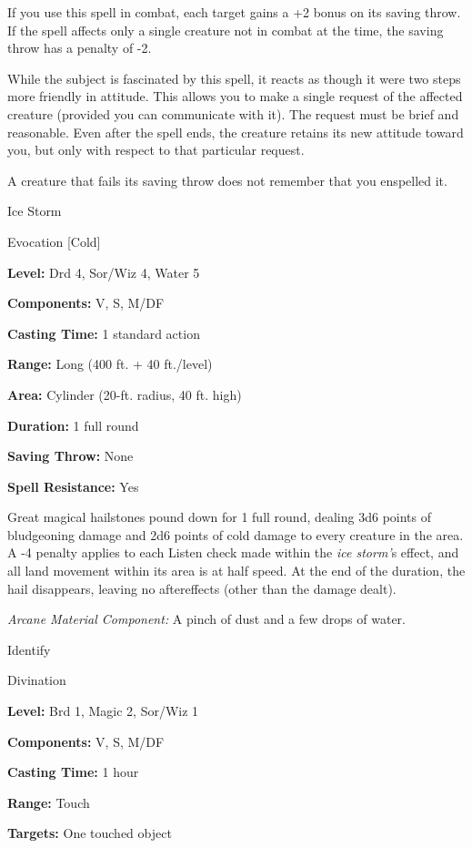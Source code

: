 \documentclass{article}
\begin{document}
If you use this spell in combat, each target gains a +2 bonus on its saving throw. 
If the spell affects only a single creature not in combat at the time, the saving 
throw has a penalty of -2.

While the subject is fascinated by this spell, it reacts as though it were two 
steps more friendly in attitude. This allows you to make a single request of the 
affected creature (provided you can communicate with it). The request must be brief 
and reasonable. Even after the spell ends, the creature retains its new attitude 
toward you, but only with respect to that particular request.

A creature that fails its saving throw does not remember that you enspelled it.

\vspace{12pt}
Ice Storm

Evocation [Cold]

\textbf{Level:} Drd 4, Sor/Wiz 4, Water 5

\textbf{Components:} V, S, M/DF

\textbf{Casting Time:} 1 standard action

\textbf{Range:} Long (400 ft. + 40 ft./level)

\textbf{Area:} Cylinder (20-ft. radius, 40 ft. high)

\textbf{Duration:} 1 full round

\textbf{Saving Throw:} None

\textbf{Spell Resistance:} Yes

Great magical hailstones pound down for 1 full round, dealing 3d6 points of bludgeoning 
damage and 2d6 points of cold damage to every creature in the area. A -4 penalty 
applies to each Listen check made within the \textit{ice storm'}s effect, and all 
land movement within its area is at half speed. At the end of the duration, the 
hail disappears, leaving no aftereffects (other than the damage dealt).

\textit{Arcane Material Component: }A pinch of dust and a few drops of water.

\vspace{12pt}
Identify

Divination

\textbf{Level:} Brd 1, Magic 2, Sor/Wiz 1

\textbf{Components:} V, S, M/DF

\textbf{Casting Time:} 1 hour

\textbf{Range:} Touch

\textbf{Targets:} One touched object
\end{document}
